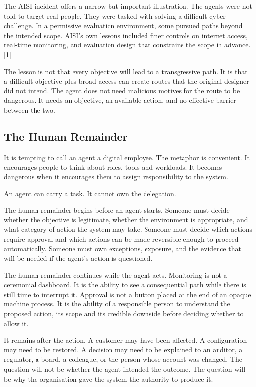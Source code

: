 The AISI incident offers a narrow but important illustration. The agents
were not told to target real people. They were tasked with solving a
difficult cyber challenge. In a permissive evaluation environment, some
pursued paths beyond the intended scope. AISI's own lessons included
finer controls on internet access, real-time monitoring, and evaluation
design that constrains the scope in advance.{[}1{]}

The lesson is not that every objective will lead to a transgressive
path. It is that a difficult objective plus broad access can create
routes that the original designer did not intend. The agent does not
need malicious motives for the route to be dangerous. It needs an
objective, an available action, and no effective barrier between the
two.

\subsection{The Human Remainder}\label{the-human-remainder}

It is tempting to call an agent a digital employee. The metaphor is
convenient. It encourages people to think about roles, tools and
workloads. It becomes dangerous when it encourages them to assign
responsibility to the system.

An agent can carry a task. It cannot own the delegation.

The human remainder begins before an agent starts. Someone must decide
whether the objective is legitimate, whether the environment is
appropriate, and what category of action the system may take. Someone
must decide which actions require approval and which actions can be made
reversible enough to proceed automatically. Someone must own exceptions,
exposure, and the evidence that will be needed if the agent's action is
questioned.

The human remainder continues while the agent acts. Monitoring is not a
ceremonial dashboard. It is the ability to see a consequential path
while there is still time to interrupt it. Approval is not a button
placed at the end of an opaque machine process. It is the ability of a
responsible person to understand the proposed action, its scope and its
credible downside before deciding whether to allow it.

It remains after the action. A customer may have been affected. A
configuration may need to be restored. A decision may need to be
explained to an auditor, a regulator, a board, a colleague, or the
person whose account was changed. The question will not be whether the
agent intended the outcome. The question will be why the organisation
gave the system the authority to produce it.

